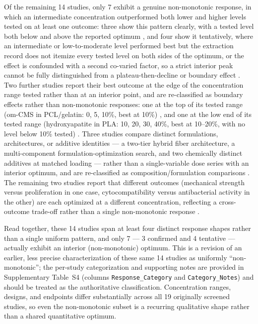 \documentclass[5p,times,twocolumn]{elsarticle}
\begin{document}
Of the remaining 14 studies, only 7 exhibit a genuine non-monotonic response, in which an intermediate concentration outperformed both lower and higher levels tested on at least one outcome: three show this pattern clearly, with a tested level both below and above the reported optimum \cite{ref43,ref50,ref67}, and four show it tentatively, where an intermediate or low-to-moderate level performed best but the extraction record does not itemize every tested level on both sides of the optimum, or the effect is confounded with a second co-varied factor, so a strict interior peak cannot be fully distinguished from a plateau-then-decline or boundary effect \cite{ref19,ref37,ref42,ref59}. Two further studies report their best outcome at the edge of the concentration range tested rather than at an interior point, and are re-classified as boundary effects rather than non-monotonic responses: one at the top of its tested range (om-CMS in PCL/gelatin: 0, 5, 10\%, best at 10\%) \cite{ref30}, and one at the low end of its tested range (hydroxyapatite in PLA: 10, 20, 30, 40\%, best at 10--20\%, with no level below 10\% tested) \cite{ref36}. Three studies compare distinct formulations, architectures, or additive identities --- a two-tier hybrid fiber architecture, a multi-component formulation-optimization search, and two chemically distinct additives at matched loading --- rather than a single-variable dose series with an interior optimum, and are re-classified as composition/formulation comparisons \cite{ref28,ref62,ref65}. The remaining two studies report that different outcomes (mechanical strength versus proliferation in one case, cytocompatibility versus antibacterial activity in the other) are each optimized at a different concentration, reflecting a cross-outcome trade-off rather than a single non-monotonic response \cite{ref57,ref61}.

Read together, these 14 studies span at least four distinct response shapes rather than a single uniform pattern, and only 7 --- 3 confirmed and 4 tentative --- actually exhibit an interior (non-monotonic) optimum. This is a revision of an earlier, less precise characterization of these same 14 studies as uniformly ``non-monotonic''; the per-study categorization and supporting notes are provided in Supplementary Table~S4 (columns \texttt{Response\_Category} and \texttt{Category\_Notes}) and should be treated as the authoritative classification. Concentration ranges, designs, and endpoints differ substantially across all 19 originally screened studies, so even the non-monotonic subset is a recurring qualitative shape rather than a shared quantitative optimum.
\end{document}

